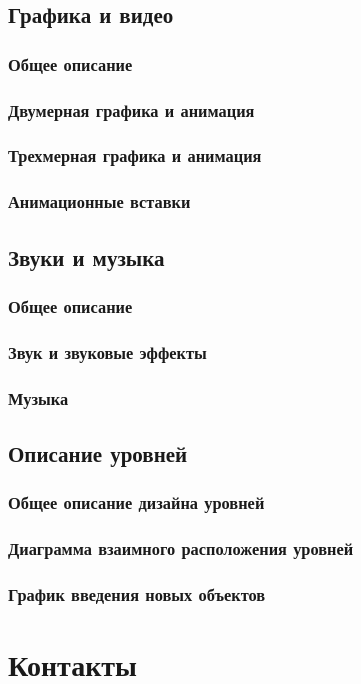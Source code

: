 \documentclass{article}
\begin{document}
\subsection{Графика и видео}

\subsubsection{Общее описание}
\subsubsection{Двумерная графика и анимация}
\subsubsection{Трехмерная графика и анимация}
\subsubsection{Анимационные вставки}

\subsection{Звуки и музыка}
\subsubsection{Общее описание}
\subsubsection{Звук и звуковые эффекты}
\subsubsection{Музыка}

\subsection{Описание уровней}
\subsubsection{Общее описание дизайна уровней}
\subsubsection{Диаграмма взаимного расположения уровней}
\subsubsection{График введения новых объектов}

\section{Контакты}

\newpage
\end{document}
